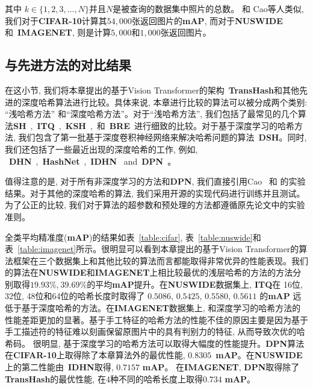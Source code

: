 其中 $k \in \{1, 2, 3, ..., N\}$并且$N$是被查询的数据集中照片的总数。
和 Cao等人类似\cite{cao2018deep,cao2017hashnet}, 我们对于\textbf{CIFAR-10}计算其$54,000$张返回图片的\textbf{mAP}, 而对于\textbf{NUSWIDE}和~\textbf{IMAGENET}, 则是计算$5,000$和$1,000$张返回图片。



\subsection{与先进方法的对比结果}
在这小节, 我们将本章提出的基于Vision Transformer的架构~\textbf{TransHash}和其他先进的深度哈希算法进行比较。具体来说, 本章进行比较的算法可以被分成两个类别: ``浅哈希方法'' 和``深度哈希方法''。对于``浅哈希方法'', 我们包括了最常见的几个算法\textbf{SH}~\cite{weiss2008spectral},~\textbf{ITQ}~\cite{gong2012iterative},~\textbf{KSH}~\cite{liu2012supervised},~和~\textbf{BRE}~\cite{kulis2009learning}进行细致的比较。对于基于深度学习的哈希方法, 我们包含了第一批基于深度卷积神经网络来解决哈希问题的算法~\textbf{DSH}\cite{liu2016deep}。同时, 我们还包括了一些最近出现的深度哈希的工作, 例如, ~\textbf{DHN}~\cite{zhu2016deep},~\textbf{HashNet}~\cite{cao2017hashnet},~\textbf{IDHN}~\cite{zhang2019improved} and~\textbf{DPN}~\cite{fan20deep}。 \par
值得注意的是, 对于所有非深度学习的方法和\textbf{DPN}, 我们直接引用Cao~\cite{cao2017hashnet} 和 \cite{fan20deep}的实验结果。对于其他的深度哈希的算法, 我们采用开源的实现代码进行训练并且测试。为了公正的比较, 我们对于算法的超参数和预处理的方法都遵循原先论文中的实验准则。 \par
全类平均精准度(\textbf{mAP})的结果如表~\ref{table:cifar}, 表~\ref{table:nuswide}和表~\ref{table:imagenet}所示。很明显可以看到本章提出的基于Vision Transformer的算法框架在三个数据集上和其他比较的算法而言都能取得非常优异的性能表现。我们的算法在\textbf{NUSWIDE}和\textbf{IMAGENET}上相比较最优的浅层哈希的方法的方法分别取得$19.93\%$,$~39.69\%$的平均\textbf{mAP}提升。在\textbf{NUSWIDE}数据集上, \textbf{ITQ}在 16位, 32位, 48位和64位的哈希长度时取得了 $0.5086$, $0.5425$, $0.5580$, $0.5611$ 的\textbf{mAP} 远低于基于深度哈希的方法。在\textbf{IMAGENET}数据集上, 和深度学习的哈希方法的性能差距更加的显著。基于手工特征的哈希方法的性能不佳的原因主要是因为基于手工描述符的特征难以刻画保留原图片中的具有判别力的特征, 从而导致次优的哈希码。 很明显, 基于深度学习的哈希方法可以取得大幅度的性能提升。\textbf{DPN}算法在\textbf{CIFAR-10}上取得除了本章算法外的最优性能, $0.8305$~\textbf{mAP}。在\textbf{NUSWIDE}上的第二性能由~\textbf{IDHN}取得, $0.7157$ \textbf{mAP}。 在\textbf{IMAGENET}, \textbf{DPN}取得除了\textbf{TransHash}的最优性能, 在4种不同的哈希长度上取得$0.734 $ \textbf{mAP}。\par
